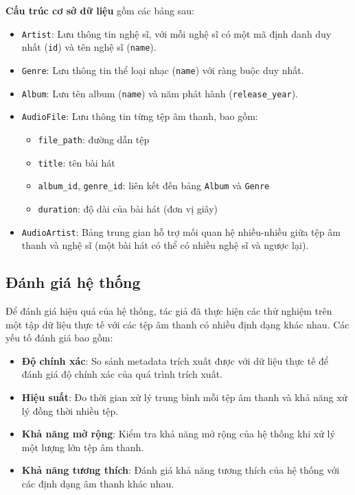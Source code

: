 \documentclass[conference]{IEEEtran}
\begin{document}
\textbf{Cấu trúc cơ sở dữ liệu} gồm các bảng sau:
\begin{itemize}
  \item \texttt{Artist}: Lưu thông tin nghệ sĩ, với mỗi nghệ sĩ có một mã định danh duy nhất (\texttt{id}) và tên nghệ sĩ (\texttt{name}).
  \item \texttt{Genre}: Lưu thông tin thể loại nhạc (\texttt{name}) với ràng buộc duy nhất.
  \item \texttt{Album}: Lưu tên album (\texttt{name}) và năm phát hành (\texttt{release\_year}).
  \item \texttt{AudioFile}: Lưu thông tin từng tệp âm thanh, bao gồm:
  \begin{itemize}
    \item \texttt{file\_path}: đường dẫn tệp
    \item \texttt{title}: tên bài hát
    \item \texttt{album\_id}, \texttt{genre\_id}: liên kết đến bảng \texttt{Album} và \texttt{Genre}
    \item \texttt{duration}: độ dài của bài hát (đơn vị giây)
  \end{itemize}
  \item \texttt{AudioArtist}: Bảng trung gian hỗ trợ mối quan hệ nhiều-nhiều giữa tệp âm thanh và nghệ sĩ (một bài hát có thể có nhiều nghệ sĩ và ngược lại).
\end{itemize}

\subsection{Đánh giá hệ thống}
Để đánh giá hiệu quả của hệ thống, tác giả đã thực hiện các thử nghiệm trên một tập dữ liệu thực tế với các tệp âm thanh có nhiều định dạng khác nhau. Các yếu tố đánh giá bao gồm:
\begin{itemize}
    \item \textbf{Độ chính xác}: So sánh metadata trích xuất được với dữ liệu thực tế để đánh giá độ chính xác của quá trình trích xuất.
    \item \textbf{Hiệu suất}: Đo thời gian xử lý trung bình mỗi tệp âm thanh và khả năng xử lý đồng thời nhiều tệp.
    \item \textbf{Khả năng mở rộng}: Kiểm tra khả năng mở rộng của hệ thống khi xử lý một lượng lớn tệp âm thanh.
    \item \textbf{Khả năng tương thích}: Đánh giá khả năng tương thích của hệ thống với các định dạng âm thanh khác nhau.
\end{itemize}
\end{document}
